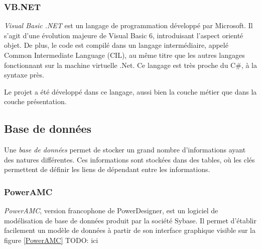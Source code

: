 
\subsubsection{VB.NET}

\textit{Visual Basic .NET} est un langage de programmation développé par Microsoft. Il s'agit d'une évolution majeure de Visual Basic 6, introduisant l'aspect orienté objet. De plus, le code est compilé dans un langage intermédiaire, appelé Common Intermediate Language (CIL), au même titre que les autres langages fonctionnant sur la machine virtuelle .Net. Ce langage est très proche du C\#, à la syntaxe près.

Le projet a été développé dans ce langage, aussi bien la couche métier que dans la couche présentation.


\subsection{Base de données}

Une \textit{base de données} permet de stocker un grand nombre d'informations ayant des natures différentes. Ces informations sont stockées dans des tables, où les clés permettent de définir les liens de dépendant entre les informations.


\subsubsection{PowerAMC}

\textit{PowerAMC}, version francophone de PowerDesigner, est un logiciel de modélisation de base de données produit par la société Sybase. Il permet d'établir facilement un modèle de données à partir de son interface graphique visible sur la figure \ref{PowerAMC} TODO: ici

